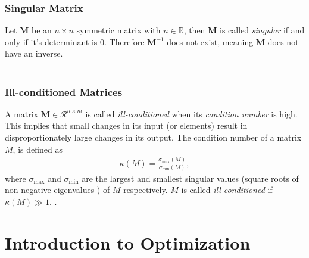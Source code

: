 \subsubsection{Singular Matrix }

Let $ \mathbf{M}$  be an $n \times n$ symmetric matrix with  $n \in \mathbb{R}$, then $ \mathbf{M}$ is called \emph{singular} if and only if it's determinant is $0$. Therefore $\mathbf{M}^{-1}$ does not exist, meaning $ \mathbf{M}$ does not have an inverse.\\\\  
\subsubsection{Ill-conditioned Matrices}
A matrix $\mathbf{M} \in \mathcal{R}^{n\times m}$ is called \emph{ill-conditioned} when its \emph{condition number} is high.
This implies that small changes in its input (or elements) result in disproportionately large changes in its output.
The condition number of a matrix $M$, is defined as 
\begin{align}
    \kappa(M) = \frac{\sigma_{\max}(M)}{\sigma_{\min}(M)},
    \end{align}
where $\sigma_{\max}$ and $\sigma_{\min}$ are the largest and smallest singular values (square roots of non-negative eigenvalues \cite{SZABO2015320}) of $M$ respectively.
$M$ is called \emph{ill-conditioned} if $\kappa(M) \gg 1$.
\cite{strang2022introduction}.
\section{Introduction to Optimization}
\label{sec:optimization}

